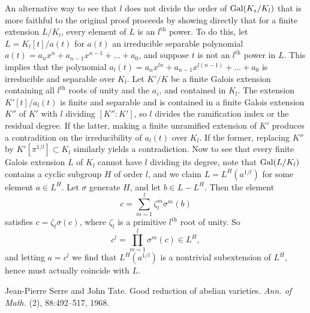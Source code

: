 \documentclass[deligne.tex]{subfiles}
\begin{document}
An alternative way to see that $l$ does not divide the order of
$\operatorname{Gal}(K_s/K_l)$ that is more faithful to the original proof proceeds by
showing directly that for a finite extension $L/K_l$, every element of $L$ is
an $l^{\text{th}}$ power. To do this, let $L=K_l[t]/a(t)$ for $a(t)$ 
an irreducible separable polynomial $a(t)=a_nx^n+a_{n-1}x^{n-1}+\ldots+a_0$, 
and suppose $t$ is not an $l^\text{th}$ power in $L$. This implies that the 
polynomial $a_l(t)=a_nx^{ln}+a_{n-1}x^{l(n-1)}+\ldots+a_0$ is irreducible and
separable over $K_l$. 
Let $K'/K$ be a finite Galois extension containing all $l^{\text{th}}$ 
roots of unity and the $a_i$, and contained in $K_l$.
The extension $K'[t]/a_l(t)$ is finite and
separable and is contained in a finite Galois extension $K''$ of $K'$ with
$l$ dividing $[K'':K']$, so $l$
divides the ramification index or the residual degree. If the latter,
making a finite unramified extension of $K'$ produces a contradition on
the irreducibility of $a_l(t)$ over $K_l$. If the former,
replacing $K''$ by $K'[\pi^{1/l}]\subset K_l$ similarly yields a contradiction.
Now to see that every finite Galois extension $L$ of $K_l$ cannot have $l$ 
dividing its degree, note that $\operatorname{Gal}(L/K_l)$ contains a cyclic subgroup $H$
of order $l$, and we claim $L=L^H(a^{1/l})$ for some element $a\in L^H$.
Let $\sigma$ generate $H$, and let $b\in L-L^H$. Then the element
\begin{equation*} c=\sum_{m=1}^l\zeta_l^m\sigma^m(b)\end{equation*}
satisfies $c=\zeta_l\sigma(c)$, where $\zeta_l$ is a primitive $l^\text{th}$
root of unity. So
\begin{equation*}c^l=\prod_{m=1}^l\sigma^m(c)\in L^H,\end{equation*}
and letting $a=c^l$ we find that $L^H(a^{1/l})$ is a nontrivial
subextension of $L^H$, hence must actually coincide with $L$.

\begin{thebibliography}{ST}
 Jean-Pierre Serre and John Tate. Good reduction of abelian varieties. \textit{Ann. of Math.} (2), 88:492–517, 1968.	
\end{thebibliography}
\end{document}
